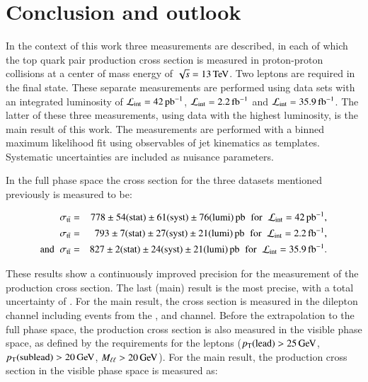 
\chapter{Conclusion and outlook}
\label{sec:out}

In the context of this work three measurements are described, in each of which the top quark pair production cross section is measured in proton-proton collisions at a center of mass energy of $\sqrt{s}=13 \,\text{Te\hspace{-.08em}V}$. Two leptons are required in the final state.
These separate measurements are performed using data sets with an integrated luminosity of $\mathcal{L}_\mathrm{int}= 42 \mbox{\ensuremath{\,\text{pb}^\text{$-$1}}}$, $\mathcal{L}_\mathrm{int}= 2.2 \mbox{\ensuremath{\,\text{fb}^\text{$-$1}}}$ and $\mathcal{L}_\mathrm{int}= 35.9 \mbox{\ensuremath{\,\text{fb}^\text{$-$1}}}$.
The latter of these three measurements, using data with the highest luminosity, is the main result of this work.
The measurements are performed with a binned maximum likelihood fit using observables of jet kinematics as templates. 
Systematic uncertainties are included as nuisance parameters.

In the full phase space the cross section for the three datasets mentioned previously is measured to be:

\begin{eqnarray*}
\sigma_{\mathrm{t}\bar{\mathrm{t}}} & = & 778 \pm  54 ({\rm stat}) \pm 61 ({\rm syst}) \pm 76 ({\rm lumi}) \mbox{\ensuremath{\,\text{pb}}} \hspace{0.2cm}  \mathrm{for} \; \;  \mathcal{L}_\mathrm{int}= 42 \mbox{\ensuremath{\,\text{pb}^\text{$-$1}}}, \\
\sigma_{\mathrm{t}\bar{\mathrm{t}}} & = & 793 \pm  7 ({\rm stat}) \pm 27 ({\rm syst}) \pm 21 ({\rm lumi}) \mbox{\ensuremath{\,\text{pb}}}  \hspace{0.2cm}  \mathrm{for} \;\; \mathcal{L}_\mathrm{int}= 2.2 \mbox{\ensuremath{\,\text{fb}^\text{$-$1}}}, \\
\mathrm{and} \; \; \sigma_{\mathrm{t}\bar{\mathrm{t}}} & = & 827 \pm 2 ({\rm stat}) \pm 24 ({\rm syst}) \pm 21 ({\rm lumi}) \mbox{\ensuremath{\,\text{pb}}} \hspace{0.2cm}  \mathrm{for} \;\; \mathcal{L}_\mathrm{int}= 35.9 \mbox{\ensuremath{\,\text{fb}^\text{$-$1}}}.
\end{eqnarray*} 

These results show a continuously improved precision for the measurement of the \ttbar production cross section. The last (main) result is the most precise, with a total uncertainty of \uncertaintytotmain. 
For the main result, the \ttbar cross section  is measured in the dilepton channel including events from the \emu, \mumu and \ee channel.
Before the extrapolation to the full phase space, the \ttbar production cross section is also measured in the visible phase space, as defined by the requirements for the leptons ($p_{\mathrm{T}}(\mathrm{lead}) > 25 \,\text{Ge\hspace{-.08em}V}$, $p_{\mathrm{T}}(\mathrm{sublead}) > 20 \,\text{Ge\hspace{-.08em}V}$, $M_{\ell\ell} > 20 \,\text{Ge\hspace{-.08em}V}$).
For the main result, the \ttbar production cross section in the visible phase space is measured as:

